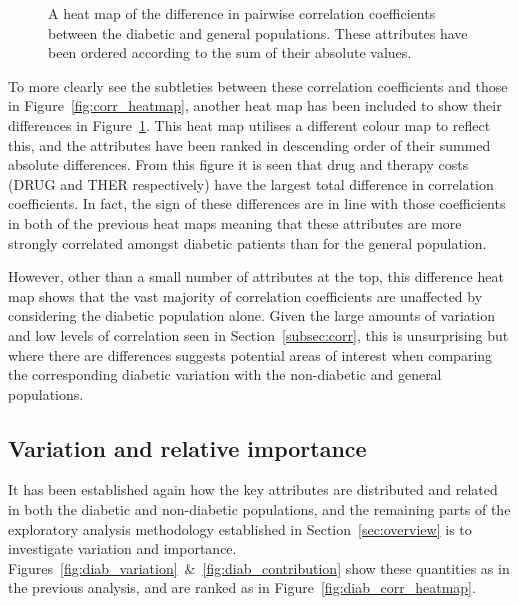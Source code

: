 \begin{figure}[htbp]
    \caption{A heat map of the difference in pairwise correlation coefficients
        between the diabetic and general populations. These attributes have been
        ordered according to the sum of their absolute values.}%
    \label{fig:diab_corr_difference}
\end{figure}

To more clearly see the subtleties between these correlation coefficients and
those in Figure~\ref{fig:corr_heatmap}, another heat map has been included to
show their differences in Figure~\ref{fig:diab_corr_difference}. This heat
map utilises a different colour map to reflect this, and the attributes have
been ranked in descending order of their summed absolute differences. From this
figure it is seen that drug and therapy costs (DRUG and THER respectively) have
the largest total difference in correlation coefficients. In fact, the sign of
these differences are in line with those coefficients in both of the previous
heat maps meaning that these attributes are more strongly correlated amongst
diabetic patients than for the general population.

However, other than a small number of attributes at the top, this difference
heat map shows that the vast majority of correlation coefficients are unaffected
by considering the diabetic population alone. Given the large amounts of
variation and low levels of correlation seen in Section~\ref{subsec:corr}, this
is unsurprising but where there are differences suggests potential areas of
interest when comparing the corresponding diabetic variation with the
non-diabetic and general populations.


\subsection{Variation and relative importance}\label{subsec:diab_variation}

It has been established again how the key attributes are distributed and related
in both the diabetic and non-diabetic populations, and the remaining parts of
the exploratory analysis methodology established in Section~\ref{sec:overview}
is to investigate variation and importance.
Figures~\ref{fig:diab_variation}~\&~\ref{fig:diab_contribution} show these
quantities as in the previous analysis, and are ranked as in
Figure~\ref{fig:diab_corr_heatmap}. 

